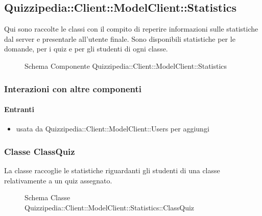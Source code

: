 \subsection{Quizzipedia::Client::ModelClient::Statistics}
Qui sono raccolte le classi con il compito di reperire informazioni sulle statistiche dal server e presentarle all'utente finale. Sono disponibili statistiche per le domande, per i quiz e per gli studenti di ogni classe.
\begin{figure}[H]
\centering
\noindent{}
\caption[Schema Componente Quizzipedia::Client::ModelClient::Statistics]{Schema Componente Quizzipedia::Client::ModelClient::Statistics}
\end{figure}
\subsubsection{Interazioni con altre componenti}
\paragraph{Entranti}
\begin{itemize}
\item usata da Quizzipedia::Client::ModelClient::Users per aggiungi
\end{itemize}
\subsubsection{Classe ClassQuiz}
La classe raccoglie le statistiche riguardanti gli studenti di una classe relativamente a un quiz assegnato.
\begin{figure}[H]
\centering
\noindent{}
\caption[Schema Classe ClassQuiz]{Schema Classe Quizzipedia::Client::ModelClient::Statistics::ClassQuiz}
\end{figure}
